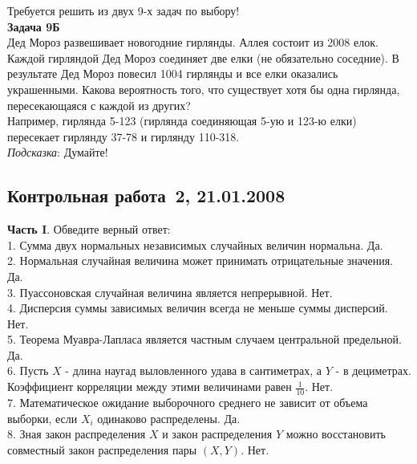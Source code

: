 \documentclass[pdftex,12pt,a4paper]{article}
\begin{document}
Требуется решить \textbf{} из двух 9-х задач по
выбору! \\



\textbf{Задача 9Б} \\
Дед Мороз развешивает новогодние гирлянды. Аллея состоит из 2008 елок. Каждой гирляндой Дед Мороз соединяет две елки (не обязательно соседние). В результате Дед Мороз повесил 1004 гирлянды и все елки оказались украшенными. Какова вероятность того, что существует хотя бы одна гирлянда, пересекающаяся с каждой из других? \\
Например, гирлянда 5-123 (гирлянда соединяющая 5-ую и 123-ю елки) пересекает гирлянду 37-78 и гирлянду 110-318. \\

\emph{Подсказка}: Думайте! \\


\subsection{Контрольная работа \No\,2, 21.01.2008}

\textbf{Часть I}. Обведите верный ответ: \\

1. Сумма двух нормальных независимых случайных величин нормальна.
Да. \\

2. Нормальная случайная величина может принимать отрицательные
значения. Да. \\

3. Пуассоновская случайная величина является непрерывной. Нет.
\\

4. Дисперсия суммы зависимых величин всегда не меньше суммы
дисперсий. Нет. \\

5. Теорема Муавра-Лапласа является частным случаем центральной
предельной. Да. \\

6. Пусть $X$ - длина наугад выловленного удава в сантиметрах, а
$Y$ - в дециметрах. Коэффициент корреляции между этими
величинами равен $\frac{1}{10}$. Нет. \\

7. Математическое ожидание выборочного среднего не зависит от
объема выборки, если $X_{i}$ одинаково распределены. Да. \\

8. Зная закон распределения $X$ и закон распределения $Y$
можно восстановить совместный закон распределения пары $(X,Y)$. Нет. \\
\end{document}
